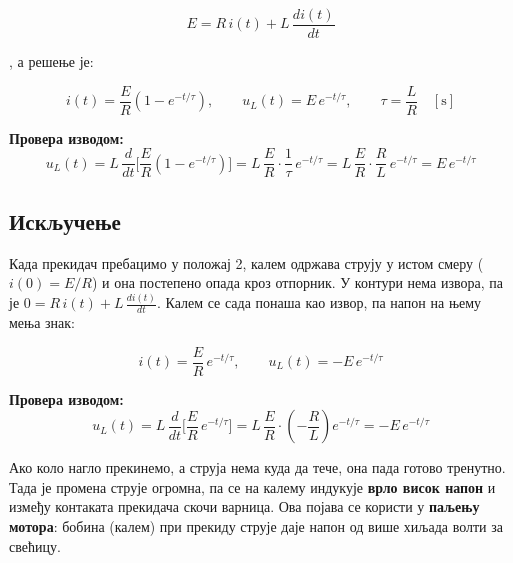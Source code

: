 \documentclass{article}
\begin{document}
\begin{equation}
    E = R\,i(t) + L\,\frac{d i(t)}{dt}
\end{equation}

, а решење је:
\begin{kljucno}
\[
i(t) = \frac{E}{R}\left(1 - e^{-t/\tau}\right), \qquad
u_L(t) = E\,e^{-t/\tau}, \qquad
\tau = \frac{L}{R} \quad [\text{s}]
\]
\end{kljucno}

\textbf{Провера изводом:}
\[
u_L(t) = L\,\frac{d}{dt}\Big[\frac{E}{R}\left(1 - e^{-t/\tau}\right)\Big]
       = L\,\frac{E}{R}\cdot\frac{1}{\tau}\,e^{-t/\tau}
       = L\,\frac{E}{R}\cdot\frac{R}{L}\,e^{-t/\tau}
       = E\,e^{-t/\tau}
\]

\subsection{Искључење}

Када прекидач пребацимо у положај 2, калем одржава струју у истом смеру
($i(0) = E/R$) и она постепено опада кроз отпорник. У контури нема извора, па
је $0 = R\,i(t) + L\,\frac{d i(t)}{dt}$. Калем се сада понаша као извор, па
напон на њему мења знак:
\begin{kljucno}
\[
i(t) = \frac{E}{R}\,e^{-t/\tau}, \qquad u_L(t) = -E\,e^{-t/\tau}
\]
\end{kljucno}

\textbf{Провера изводом:}
\[
u_L(t) = L\,\frac{d}{dt}\Big[\frac{E}{R}\,e^{-t/\tau}\Big]
       = L\,\frac{E}{R}\cdot\left(-\frac{R}{L}\right) e^{-t/\tau}
       = -E\,e^{-t/\tau}
\]

Ако коло нагло прекинемо, а струја нема куда да тече, она пада готово
тренутно. Тада је промена струје огромна, па се на калему индукује
\textbf{врло висок напон} и између контаката прекидача скочи варница. Ова
појава се користи у \textbf{паљењу мотора}: бобина (калем) при прекиду струје
даје напон од више хиљада волти за свећицу.
\end{document}
